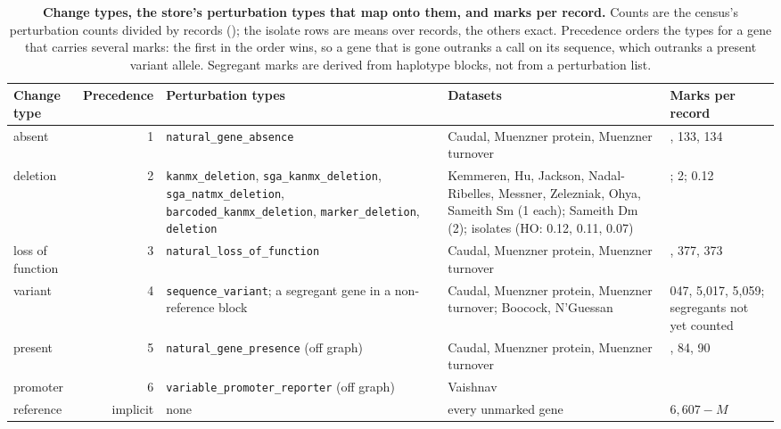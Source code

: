 \begin{table}[htbp]
\centering
\scriptsize
\setlength{\tabcolsep}{3pt}
\caption[]{\textbf{Change types, the store's perturbation types that map onto them, and
marks per record.} Counts are the census's perturbation counts divided by records
(); the isolate rows are means over records, the others
exact. Precedence orders the types for a gene that carries several marks: the first in
the order wins, so a gene that is gone outranks a call on its sequence, which outranks
a present variant allele. Segregant marks are derived from haplotype blocks, not from
a perturbation list.}
\label{tab:change-types}
\begin{tabular}{>{\raggedright\arraybackslash}p{20mm}r>{\raggedright\arraybackslash}p{44mm}>{\raggedright\arraybackslash}p{48mm}>{\raggedright\arraybackslash}p{46mm}}
\toprule
Change type & Precedence & Perturbation types & Datasets & Marks per record \\
\midrule
absent & 1 & \texttt{natural\_gene\_absence} & Caudal, Muenzner protein, Muenzner turnover & 135, 133, 134 \\
deletion & 2 & \texttt{kanmx\_deletion}, \texttt{sga\_kanmx\_deletion}, \texttt{sga\_natmx\_deletion}, \texttt{barcoded\_kanmx\_deletion}, \texttt{marker\_deletion}, \texttt{deletion} & Kemmeren, Hu, Jackson, Nadal-Ribelles, Messner, Zelezniak, Ohya, Sameith Sm (1 each); Sameith Dm (2); isolates (HO: 0.12, 0.11, 0.07) & 1; 2; 0.12 \\
loss of function & 3 & \texttt{natural\_loss\_of\_function} & Caudal, Muenzner protein, Muenzner turnover & 383, 377, 373 \\
variant & 4 & \texttt{sequence\_variant}; a segregant gene in a non-reference block & Caudal, Muenzner protein, Muenzner turnover; Boocock, N'Guessan & 5{,}047, 5{,}017, 5{,}059; segregants not yet counted \\
present & 5 & \texttt{natural\_gene\_presence} (off graph) & Caudal, Muenzner protein, Muenzner turnover & 84, 84, 90 \\
promoter & 6 & \texttt{variable\_promoter\_reporter} (off graph) & Vaishnav & 1 \\
reference & implicit & none & every unmarked gene & $6{,}607-M$ \\
\bottomrule
\end{tabular}
\end{table}

